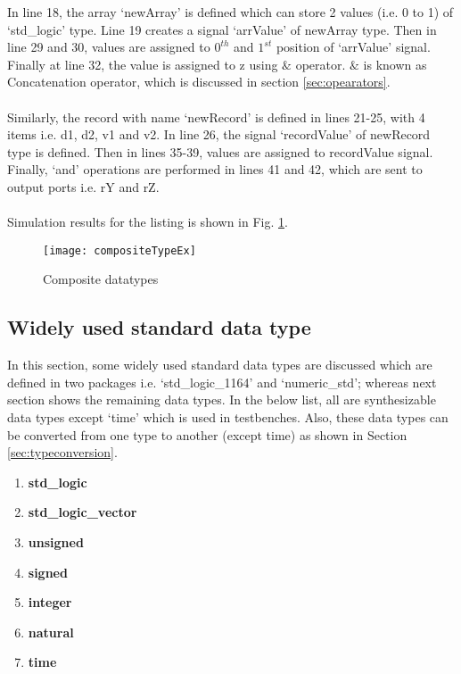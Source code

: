 \begin{explanation}
	In line 18, the array `newArray' is defined which can store 2 values (i.e. 0 to 1) of `std\_logic' type. Line 19 creates a signal `arrValue' of newArray type. Then in line 29 and 30, values are assigned to $0^{th}$ and $1^{st}$ position of `arrValue' signal. Finally at line 32, the value is assigned to z using $\&$ operator. $\&$ is known as Concatenation operator, which is discussed in section \ref{sec:opearators}.
	\\ \\
	Similarly, the record with name `newRecord' is defined in lines 21-25, with 4 items i.e. d1, d2, v1 and v2. In line 26, the signal `recordValue' of newRecord type is defined. Then in lines 35-39, values are assigned to recordValue signal. Finally, `and' operations are performed in lines 41 and 42, which are sent to output ports i.e. rY and rZ. 
	\\ \\
	Simulation results for the listing is shown in Fig. \ref{fig:compositeTypeEx}. 
\end{explanation}


\begin{figure}[!h]
	\centering
	\texttt{[image: compositeTypeEx]}
	\caption{Composite datatypes}
	\label{fig:compositeTypeEx}
\end{figure}

\subsection{Widely used standard data type}
In this section, some widely used standard data types are discussed which are defined in two packages i.e. `std\_logic\_1164' and `numeric\_std'; whereas next section shows the remaining data types. In the below list, all are synthesizable data types except `time' which is used in testbenches. Also, these data types can be converted from one type to another (except time) as shown in Section \ref{sec:typeconversion}. 

\begin{enumerate}
	\item \textbf{std\_logic}
	\item \textbf{std\_logic\_vector}
	\item \textbf{unsigned}
	\item \textbf{signed}
	\item \textbf{integer}
	\item \textbf{natural}
	\item \textbf{time}
\end{enumerate}

